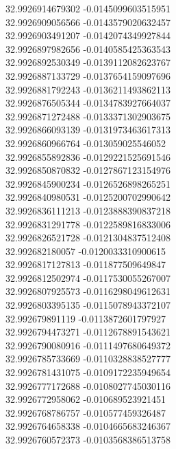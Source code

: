 {32.9926914679302	-0.0145099603515951\\
32.9926909056566	-0.0143579020632457\\
32.9926903491207	-0.0142074349927844\\
32.9926897982656	-0.0140585425363543\\
32.9926892530349	-0.0139112082623767\\
32.9926887133729	-0.0137654159097696\\
32.9926881792243	-0.0136211493862113\\
32.9926876505344	-0.0134783927664037\\
32.9926871272488	-0.0133371302903675\\
32.9926866093139	-0.0131973463617313\\
32.9926860966764	-0.013059025546052\\
32.9926855892836	-0.0129221525691546\\
32.9926850870832	-0.0127867123154976\\
32.9926845900234	-0.0126526898265251\\
32.9926840980531	-0.0125200702990642\\
32.9926836111213	-0.0123888390837218\\
32.9926831291778	-0.0122589816833006\\
32.9926826521728	-0.0121304837512408\\
32.992682180057	-0.0120033310900615\\
32.9926817127813	-0.011877509649847\\
32.9926812502974	-0.0117530055267007\\
32.9926807925573	-0.0116298049612631\\
32.9926803395135	-0.0115078943372107\\
32.992679891119	-0.0113872601797927\\
32.9926794473271	-0.0112678891543621\\
32.9926790080916	-0.0111497680649372\\
32.9926785733669	-0.0110328838527777\\
32.9926781431075	-0.0109172235949654\\
32.9926777172688	-0.0108027745030116\\
32.9926772958062	-0.010689523921451\\
32.9926768786757	-0.010577459326487\\
32.9926764658338	-0.0104665683246367\\
32.9926760572373	-0.0103568386513758\\
}
